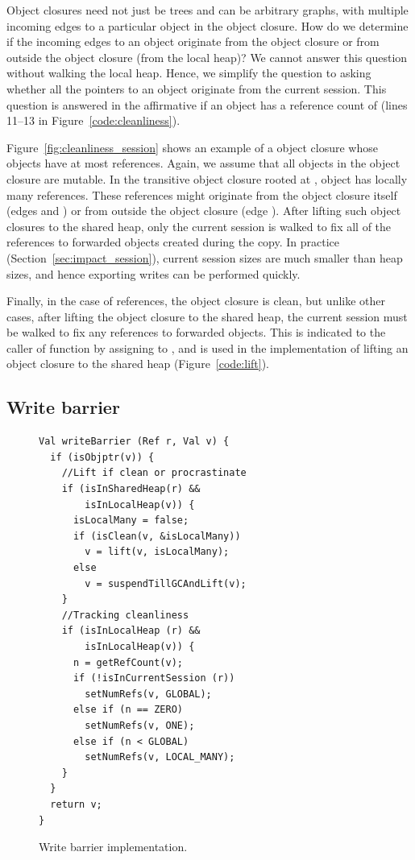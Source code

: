 Object closures need not just be trees and can be arbitrary graphs, with
multiple incoming edges to a particular object in the object closure. How do we
determine if the incoming edges to an object originate from the object closure
or from outside the object closure (from the local heap)? We cannot answer this
question without walking the local heap. Hence, we simplify the question to
asking whether all the pointers to an object originate from the current
session. This question is answered in the affirmative if an object has a
reference count of  (lines 11--13 in
Figure~\ref{code:cleanliness}).

Figure~\ref{fig:cleanliness_session} shows an example of a object closure whose
objects have at most  references. Again, we assume that all
objects in the object closure are mutable. In the transitive object closure
rooted at , object  has locally many references. These references
might originate from the object closure itself (edges 
and ) or from outside the object closure (edge ). After lifting such object closures to the shared heap, only
the current session is walked to fix all of the references to forwarded objects
created during the copy. In practice (Section~\ref{sec:impact_session}),
current session sizes are much smaller than heap sizes, and hence exporting
writes can be performed quickly.

Finally, in the case of  references, the object closure is
clean, but unlike other cases, after lifting the object closure to the shared
heap, the current session must be walked to fix any references to forwarded
objects. This is indicated to the caller of  function by assigning
 to , and is used in the implementation of lifting an
object closure to the shared heap (Figure~\ref{code:lift}).

\subsection{Write barrier}
\label{sec:write_barrier}

\begin{figure}
\begin{lstlisting}
Val writeBarrier (Ref r, Val v) {
  if (isObjptr(v)) {
    //Lift if clean or procrastinate
    if (isInSharedHeap(r) &&
        isInLocalHeap(v)) {
      isLocalMany = false;
      if (isClean(v, &isLocalMany))
        v = lift(v, isLocalMany);
      else
        v = suspendTillGCAndLift(v);
    }
    //Tracking cleanliness
    if (isInLocalHeap (r) &&
        isInLocalHeap(v)) {
      n = getRefCount(v);
      if (!isInCurrentSession (r))
        setNumRefs(v, GLOBAL);
      else if (n == ZERO)
        setNumRefs(v, ONE);
      else if (n < GLOBAL)
        setNumRefs(v, LOCAL_MANY);
    }
  }
  return v;
}
\end{lstlisting}
\caption{Write barrier implementation.}
\label{code:writeBarrier}
\end{figure}

